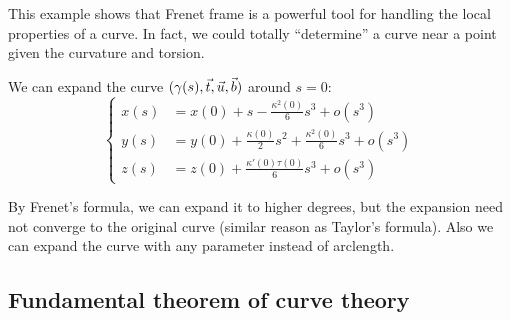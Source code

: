 This example shows that Frenet frame is a powerful tool
for handling the local properties of a curve.
In fact, we could totally ``determine'' a curve near a point
given the curvature and torsion.

\begin{example}
    We can expand the curve $(\gamma(s), \vec{t},\vec{u},\vec{b})$ around $s=0$:
	\[
	\left\{\begin{aligned}
			x(s) &= x(0) + s - \frac{\kappa^2(0)}{6}s^3 + o(s^3)\\
			y(s) &= y(0) + \frac{\kappa(0)}{2}s^2 + \frac{\kappa^2(0)}{6}s^3 + o(s^3)\\
			z(s) &= z(0) + \frac{\kappa'(0)\tau(0)}{6}s^3 + o(s^3)
	\end{aligned}\right.
	\]
\end{example}
\begin{remark}
    By Frenet's formula, we can expand it to higher degrees, but the expansion
	need not converge to the original curve (similar reason as Taylor's formula).
	Also we can expand the curve with any parameter instead of arclength.
\end{remark}

\subsection{Fundamental theorem of curve theory}
\label{sub:Fundamental theorem of curve theory}

